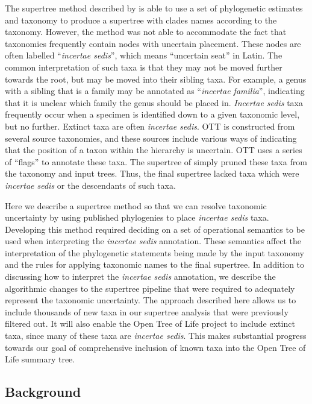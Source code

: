 \documentclass[english]{article}
\begin{document}
The supertree method described by \citet{redelings2017supertree} is
able to use a set of phylogenetic estimates and taxonomy to produce a
supertree with clades names according to the taxonomy.
However, the
method was not able to accommodate the fact that taxonomies frequently
contain nodes with uncertain placement.
These nodes are often labelled
``\emph{incertae sedis}'', which means ``uncertain seat'' in Latin.
The common interpretation of such taxa is that they may not be moved
further towards the root, but may be moved into their sibling taxa.
For example, a genus with a sibling that is a family may be annotated
as ``\emph{incertae familia}'', indicating that it is unclear which
family the genus should be placed in.
\emph{Incertae sedis} taxa
frequently occur when a specimen is identified down to a given
taxonomic level, but no further.
Extinct taxa are often \emph{incertae
sedis}.
OTT is constructed from several source taxonomies, and these
sources include various ways of indicating that the position of a
taxon within the hierarchy is uncertain.
OTT uses a series of
``flags'' to annotate these taxa.
The supertree of \citet{redelings2017supertree} simply pruned these taxa from the
taxonomy and input trees.
Thus, the final supertree lacked taxa which
were \emph{incertae sedis} or the descendants of such taxa.

Here we describe a supertree method so that we can resolve taxonomic
uncertainty by using published phylogenies to place \emph{incertae
sedis} taxa.
Developing this method required deciding on a set of
operational semantics to be used when interpreting the \emph{incertae
sedis} annotation.
These semantics affect the interpretation of the
phylogenetic statements being made by the input taxonomy and the rules
for applying taxonomic names to the final supertree.
In addition to
discussing how to interpret the \emph{incertae sedis} annotation,
we describe the algorithmic changes to the supertree pipeline that
were required to adequately represent the taxonomic uncertainty.
The
approach described here allows us to include thousands of new taxa in
our supertree analysis that were previously filtered out.
It will also
enable the Open Tree of Life project to include extinct taxa, since
many of these taxa are \emph{incertae sedis}.
This makes substantial
progress towards our goal of comprehensive inclusion of known taxa
into the Open Tree of Life summary tree.

\subsection{Background}
\end{document}
